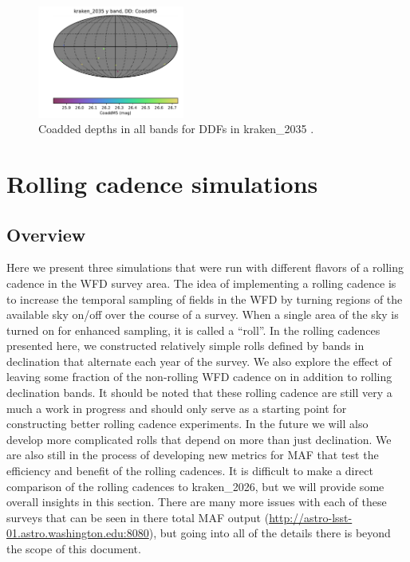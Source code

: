 \documentclass[DM,authoryear,toc]{lsstdoc}
\begin{document}
\begin{figure}[ht]
\includegraphics[width=0.43\textwidth]{figures/kraken_2035_CoaddM5_y_band_DD_HEAL_SkyMap.pdf}
\caption{Coadded depths in all bands for DDFs in kraken\_2035 .}
\label{fig:ddcoad-2035}
\end{figure}

\clearpage

\section{Rolling cadence simulations}

\subsection{Overview}

Here we present three simulations that were run with different flavors of a rolling cadence in the WFD survey area.
The idea of implementing a rolling cadence is to increase the temporal sampling of fields in the WFD by turning
regions of the available sky on/off over the course of a survey. When a single area of the sky is turned on for
enhanced sampling, it is called a ``roll''. In the rolling cadences presented here, we constructed relatively simple
rolls defined by bands in declination that alternate each year of the survey. We also explore the
effect of leaving some fraction of the non-rolling WFD cadence on in addition to rolling declination bands.
It should be noted that these rolling cadence are still very a much a work in progress and should only
serve as a starting point for constructing better rolling cadence experiments. In the future we will also develop more
complicated rolls that depend on more than just declination. We are also still in the process of developing new
metrics for MAF that test the efficiency and benefit of the rolling cadences. It is difficult to make a direct comparison
of the rolling cadences to kraken\_2026, but we will provide some overall insights in this section. There are many
more issues with each of these surveys that can be seen in there total MAF output (\url{http://astro-lsst-01.astro.washington.edu:8080}),
but going into all of the details there is beyond the scope of this document.
\end{document}
